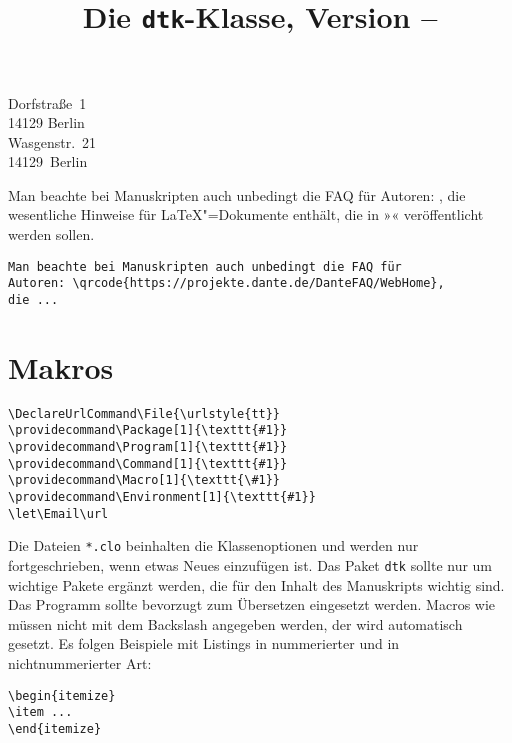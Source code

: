 \documentclass[ngerman]{dtk}
\let\File\texttt
\let\Package\texttt
\begin{document}
\title{Die \texttt{dtk}-Klasse, Version \DTKversion -- \DTKversiondate}
%
    {Dorfstraße~1\\
     14129 Berlin\\
     }
%
    {Wasgenstr.~21\\
     14129~Berlin\\
     }
\maketitle

Man beachte bei Manuskripten auch unbedingt die FAQ für 
Autoren: ,
die wesentliche Hinweise für \LaTeX"=Dokumente enthält, die in 
»\DTK« veröffentlicht werden sollen.


\begin{verbatim}
Man beachte bei Manuskripten auch unbedingt die FAQ für 
Autoren: \qrcode{https://projekte.dante.de/DanteFAQ/WebHome},
die ...
\end{verbatim}



\section{Makros}

\begin{verbatim}
\DeclareUrlCommand\File{\urlstyle{tt}}
\providecommand\Package[1]{\texttt{#1}}
\providecommand\Program[1]{\texttt{#1}}
\providecommand\Command[1]{\texttt{#1}}
\providecommand\Macro[1]{\texttt{\#1}}
\providecommand\Environment[1]{\texttt{#1}}
\let\Email\url
\end{verbatim}

Die Dateien \File{*.clo} beinhalten die Klassenoptionen und
werden nur fortgeschrieben, wenn etwas Neues einzufügen ist. Das Paket
\Package{dtk} sollte nur um wichtige Pakete ergänzt werden, die für den Inhalt
des Manuskripts wichtig sind. Das Programm  sollte bevorzugt
zum Übersetzen eingesetzt werden. Macros wie  müssen nicht mit
dem Backslash angegeben werden, der wird automatisch gesetzt. Es folgen
Beispiele mit Listings in nummerierter und in nichtnummerierter Art:

\begin{lstlisting}[style=number]
\begin{itemize}
\item ...
\end{itemize}
\end{lstlisting}
\end{document}

